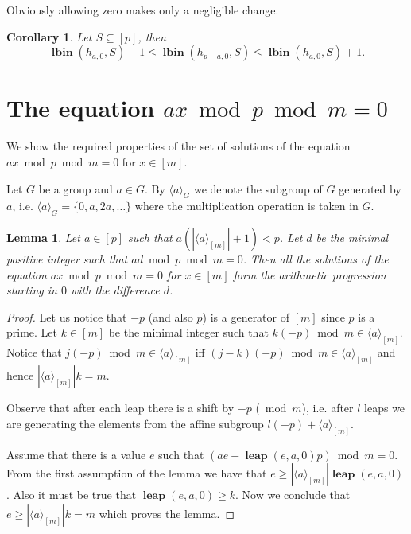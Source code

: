 \documentclass{article}
\newcommand{\leap}[3]{\operatorname{\mathbf{leap}}({#1}, {#2}, {#3})}
\newcommand{\lbin}[2]{\operatorname{\mathbf{lbin}}({#1}, {#2})}
\newtheorem{lemma}{Lemma}
\newtheorem{corollary}{Corollary}
\begin{document}
Obviously allowing zero makes only a negligible change.
\begin{corollary}
Let $S \subseteq [p]$, then
\[
\lbin{h_{a, 0}}{S} -1 \leq \lbin{h_{p - a, 0}}{S} \leq \lbin{h_{a, 0}}{S} + 1.
\]
\end{corollary}

\section{The equation $ax \bmod p \bmod m = 0$}

We show the required properties of the set of solutions of the equation $ax \bmod p \bmod m = 0$ for $x \in [m]$.

Let $G$ be a group and $a \in G$. By $\langle a \rangle_{G}$ we denote the subgroup of $G$ generated by $a$, i.e. $\langle a \rangle_{G} = \{0, a, 2a, \dots \}$ where the multiplication operation is taken in $G$.

\begin{lemma}
Let $a \in [p]$ such that $a (|\langle a \rangle_{[m]}| + 1) < p$. Let $d$ be the minimal positive integer such that $ad \bmod p \bmod m = 0$.
Then all the solutions of the equation $ax \bmod p \bmod m = 0$ for $x \in [m]$ form the arithmetic progression starting in $0$ with the difference $d$.
\end{lemma}
\begin{proof}
Let us notice that $-p$ (and also $p$) is a generator of $[m]$ since $p$ is a prime.
Let $k \in [m]$ be the minimal integer such that $k(-p) \bmod m \in \langle a \rangle_{[m]}$.
Notice that $j(-p) \bmod m \in \langle a \rangle_{[m]}$ iff $(j - k)(-p) \bmod m \in \langle a \rangle_{[m]}$ and hence $|\langle a \rangle_{[m]}| k = m$.

Observe that after each leap there is a shift by $-p$ ($\bmod m$), i.e. after $l$ leaps we are generating the elements from the affine subgroup $l(-p) + \langle a \rangle_{[m]}$.

Assume that there is a value $e$ such that $(ae - \leap{e}{a}{0}p) \bmod m = 0$.
From the first assumption of the lemma we have that $e \geq |\langle a \rangle_{[m]}| \leap{e}{a}{0}$.
Also it must be true that $\leap{e}{a}{0} \geq k$.
Now we conclude that $e \geq |\langle a \rangle_{[m]}| k = m$ which proves the lemma.
\end{proof}
\end{document}
